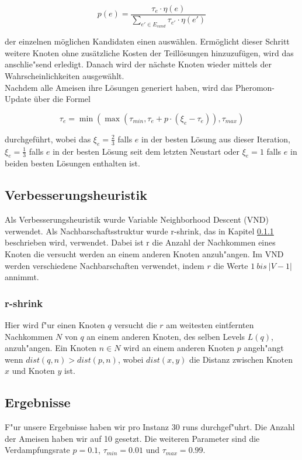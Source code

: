 \documentclass[a4paper,10pt]{article}
\begin{document}
\begin{displaymath} 
p(e) = \frac{\tau_{e} \cdot \eta(e)}{\sum_{e' \in E_{cand}} \tau_{e'} \cdot \eta(e')}
\end{displaymath}

der einzelnen m\"{o}glichen Kandidaten einen ausw\"{a}hlen. Erm\"{o}glicht dieser Schritt weitere Knoten ohne zus\"{a}tzliche Kosten der Teill\"{o}sungen hinzuzuf\"{u}gen, wird das anschlie"send erledigt. Danach wird der n\"{a}chste Knoten wieder mittels der Wahrscheinlichkeiten ausgew\"{a}hlt.\\
Nachdem alle Ameisen ihre L\"{o}sungen generiert haben, wird das Pheromon-Update \"{u}ber die Formel
 
\begin{displaymath} 
\tau_{e} = \min(\max(\tau_{min},\tau_{e} + p \cdot (\xi_e - \tau_{e})),\tau_{max})
\end{displaymath}

durchgef\"{u}hrt, wobei das $\xi_e=\frac{2}{3}$ falls $e$ in der besten L\"{o}sung aus dieser Iteration, $\xi_e=\frac{1}{3}$ falls
$e$ in der besten L\"{o}sung seit dem letzten Neustart oder $\xi_e=1$ falls $e$ in beiden besten L\"{o}sungen enthalten ist.

\subsection{Verbesserungsheuristik}
Als Verbesserungsheuristik wurde Variable Neighborhood Descent (VND) verwendet. Als Nachbarschaftsstruktur wurde r-shrink, das in Kapitel \ref{sec:shrink} beschrieben wird, verwendet. Dabei ist r die Anzahl der Nachkommen eines Knoten die versucht werden an einem anderen Knoten anzuh"angen. Im VND werden verschiedene Nachbarschaften verwendet, indem $r$ die Werte $1\ bis\ |V-1|$ annimmt.

\subsubsection{r-shrink}
\label{sec:shrink}
Hier wird f"ur einen Knoten $q$ versucht die $r$ am weitesten eintfernten Nachkommen $N$ von $q$ an einem anderen Knoten, des selben Levels $L(q)$, anzuh"angen. Ein Knoten $n \in N$ wird an einem anderen Knoten $p$ angeh"angt wenn $dist(q,n) > dist(p,n)$, wobei $dist(x,y)$ die Distanz zwischen Knoten $x$ und Knoten $y$ ist. 

\subsection{Ergebnisse}
F"ur unsere Ergebnisse haben wir pro Instanz 30 runs durchgef"uhrt. Die Anzahl der Ameisen haben wir auf 10 gesetzt. Die weiteren Parameter sind die Verdampfungsrate $p=0.1$, $\tau_{min}=0.01$ und $\tau_{max}=0.99$.
\end{document}
